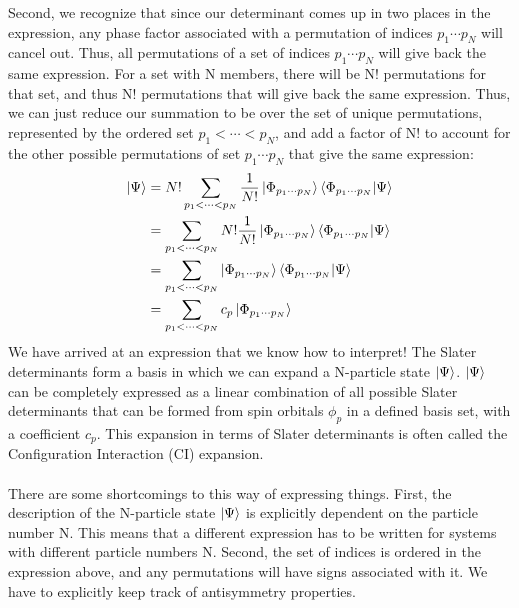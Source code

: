 \documentclass{article}
\begin{document}
Second, we recognize that since our determinant comes up in two places in the expression, any phase factor associated with a permutation of indices $p_1 \cdots p_N$ will cancel out. 
Thus, all permutations of a set of indices $p_1 \cdots p_N$ will give back the same expression.
For a set with N members, there will be N! permutations for that set, and thus N! permutations that will give back the same expression.
Thus, we can just reduce our summation to be over the set of unique permutations, represented by the ordered set $p_1 < \cdots < p_N$, and add a factor of N! to account for the 
other possible permutations of set $p_1 \cdots p_N$ that give the same expression: 
\begin{align*}
\ket{\Psi} &=N! \sum_{p_1 < \cdots < p_N}  \frac{1}{N!} \ket{\Phi_{p_1 \cdots p_N}}\braket{\Phi_{p_1 \cdots p_N} | \Psi}   \\
&=  \sum_{p_1 < \cdots < p_N} N! \frac{1}{N!} \ket{\Phi_{p_1 \cdots p_N}}\braket{\Phi_{p_1 \cdots p_N} | \Psi}   \\
&=  \sum_{p_1 < \cdots < p_N} \ket{\Phi_{p_1 \cdots p_N}}\braket{\Phi_{p_1 \cdots p_N} | \Psi}   \\
&=  \sum_{p_1 < \cdots < p_N} c_p \ket{\Phi_{p_1 \cdots p_N}} \\
\end{align*}
We have arrived at an expression that we know how to interpret! 
The Slater determinants form a basis in which we can expand a N-particle state $\ket{\Psi}$. 
$\ket{\Psi}$ can be completely expressed as a linear combination of all possible Slater determinants that can be formed from spin orbitals $\phi_p$ in a defined basis set, with a coefficient $c_p$. 
This expansion in terms of Slater determinants is often called the Configuration Interaction (CI) expansion.
\\ \\
There are some shortcomings to this way of expressing things. 
First, the description of the N-particle state $\ket{\Psi}$ is explicitly dependent on the particle number N. 
This means that a different expression has to be written for systems with different particle numbers N. 
Second, the set of indices is ordered in the expression above, and any permutations will have signs associated with it.
We have to explicitly keep track of antisymmetry properties.
\end{document}
